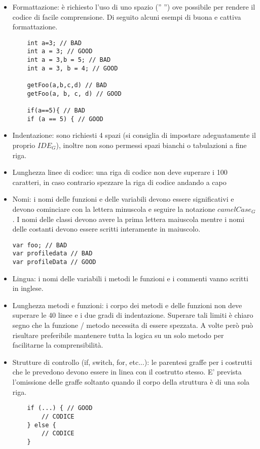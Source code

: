 			\begin{itemize}
			\item Formattazione: è richiesto l'uso di uno spazio ('' '') ove possibile per rendere il codice di facile comprensione.
			Di seguito alcuni  esempi di buona e cattiva formattazione.
\begin{lstlisting}
	int a=3; // BAD
	int a = 3; // GOOD
	int a = 3,b = 5; // BAD
	int a = 3, b = 4; // GOOD

	getFoo(a,b,c,d) // BAD
	getFoo(a, b, c, d) // GOOD

	if(a==5){ // BAD
	if (a == 5) { // GOOD
\end{lstlisting}
			
			\item Indentazione: sono richiesti 4 spazi (si consiglia di impostare adeguatamente il proprio $IDE_G$), inoltre non sono permessi spazi bianchi o tabulazioni a fine riga.
			
			\item Lunghezza linee di codice: una riga di codice non deve superare i 100 caratteri, in caso contrario spezzare la riga di codice andando a capo
			
			\item Nomi: i nomi delle funzioni e delle variabili devono essere significativi e devono cominciare con la lettera minuscola e seguire la notazione $camelCase_G$. I nomi delle classi devono avere la prima lettera maiuscola mentre i nomi delle costanti devono essere scritti interamente in maiuscolo.
\begin{lstlisting}
var foo; // BAD
var profiledata // BAD
var profileData // GOOD
\end{lstlisting}
			
			\item Lingua: i nomi delle variabili i metodi le funzioni e i commenti vanno scritti in inglese.
			
			\item Lunghezza metodi e funzioni: i corpo dei metodi e delle funzioni non deve superare le 40 linee e i due gradi di indentazione. Superare tali limiti è chiaro segno che la funzione / metodo necessita di essere spezzata. A volte però può risultare preferibile mantenere tutta la logica su un solo metodo per facilitarne la comprensibilità. 
			
			\item Strutture di controllo (if, switch, for, etc...): le parentesi graffe per i costrutti che le prevedono devono essere in linea con il costrutto stesso. E' prevista l'omissione delle graffe soltanto quando il corpo della struttura è di una sola riga.
\begin{lstlisting}
	if (...) { // GOOD
		// CODICE
	} else {
		// CODICE
	}



\end{lstlisting}
\end{itemize}
